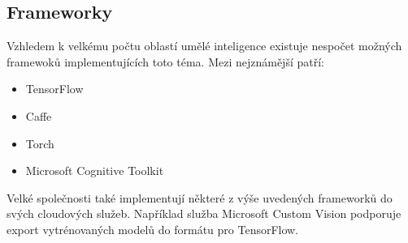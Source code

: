 \subsection{Frameworky}
Vzhledem k velkému počtu oblastí umělé inteligence existuje nespočet možných framewoků implementujících toto téma. Mezi nejznámější patří:
\begin{itemize}
	\item TensorFlow
	\item Caffe
	\item Torch
	\item Microsoft Cognitive Toolkit
\end{itemize}

Velké společnosti také implementují některé z výše uvedených frameworků do svých cloudových služeb. Například služba Microsoft Custom Vision podporuje export vytrénovaných modelů do formátu pro TensorFlow.